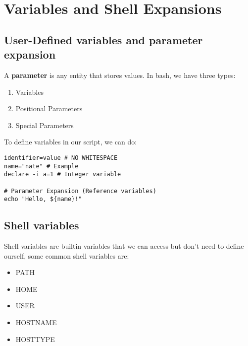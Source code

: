 \documentclass{report}
\begin{document}
    \pagebreak \bigbreak \noindent 
    \section{\LARGE Variables and Shell Expansions}
    \bigbreak \noindent 
    \subsection{User-Defined variables and parameter expansion}
    \bigbreak \noindent 
    \smallbreak \noindent
    \begin{definition}
        A \textbf{parameter} is any entity that stores values. In bash, we have three types:
        \begin{enumerate}
            \item Variables
            \item Positional Parameters
            \item Special Parameters
        \end{enumerate}
    \end{definition}
    \bigbreak \noindent 
    To define variables in our script, we can do:
    \begin{mdframed}[style=purplebox]
    \begin{verbatim}
identifier=value # NO WHITESPACE
name="nate" # Example
declare -i a=1 # Integer variable

# Parameter Expansion (Reference variables)
echo "Hello, ${name}!" 
    \end{verbatim}
    \bigbreak \noindent 
    \end{mdframed}

    \bigbreak \noindent 
    \subsection{Shell variables}
    \bigbreak \noindent 
    Shell variables are builtin variables that we can access but don't need to define ourself, some common shell variables are:
    \begin{itemize}
        \item PATH
        \item HOME 
        \item USER 
        \item HOSTNAME
        \item HOSTTYPE
    \end{itemize}
    \bigbreak \noindent 
\end{document}

